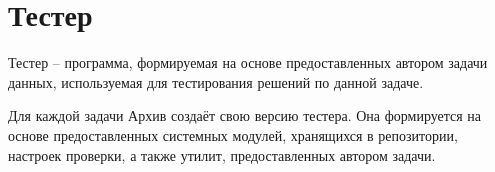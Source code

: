 \section{Тестер}
\label{bacssystem}
Тестер -- программа, формируемая на основе предоставленных
автором задачи данных, используемая для тестирования решений
по данной задаче.

Для каждой задачи Архив создаёт свою версию тестера.
Она формируется на основе предоставленных системных
модулей, хранящихся в репозитории, настроек проверки,
а также утилит, предоставленных автором задачи.
